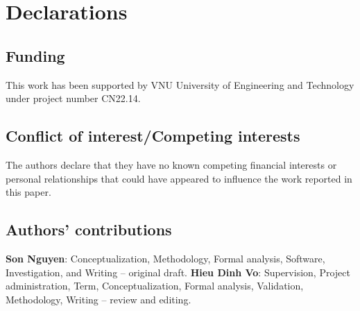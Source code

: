 \section*{Declarations}

\subsection*{Funding}
This work has been supported by VNU University of Engineering and Technology under project number CN22.14.

\subsection*{Conflict of interest/Competing interests}
The authors declare that they have no known competing financial interests or personal relationships that could have appeared to influence the work reported in this paper.

\subsection*{Authors' contributions}
\textbf{Son Nguyen}: Conceptualization, Methodology, Formal analysis, Software, Investigation, and Writing – original draft. \textbf{Hieu Dinh Vo}: Supervision, Project administration, Term, Conceptualization, Formal analysis, Validation, Methodology, Writing – review and editing.




